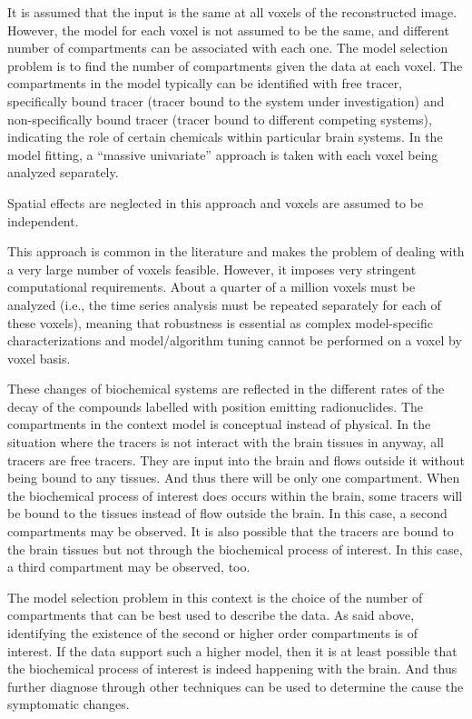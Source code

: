 It is assumed that the input is the same at all voxels of the reconstructed image. However, the model for each voxel is not assumed to be the same, and different number of compartments can be associated with each one. The model selection problem is to find the number of compartments given the data at each voxel. The compartments in the model typically can be identified with free tracer, specifically bound tracer (tracer bound to the system under investigation) and non-specifically bound tracer (tracer bound to different competing systems), indicating the role of certain chemicals within particular brain systems. In the model fitting, a ``massive univariate'' approach is taken with each voxel being analyzed separately.
\begin{draftpar}
Spatial effects are neglected in this approach and voxels are assumed to be independent.
\end{draftpar}
This approach is common in the literature and makes the problem of dealing with a very large number of voxels feasible. However, it imposes very stringent computational requirements. About a quarter of a million voxels must be analyzed (i.e., the time series analysis must be repeated separately for each of these voxels), meaning that robustness is essential as complex model-specific characterizations and model/algorithm tuning cannot be performed on a voxel by voxel basis.

\begin{draftpar}
These changes of biochemical systems are reflected in the different rates of the decay of the compounds labelled with position emitting radionuclides. The compartments in the context \pet model is conceptual instead of physical. In the situation where the tracers is not interact with the brain tissues in anyway, all tracers are free tracers. They are input into the brain and flows outside it without being bound to any tissues. And thus there will be only one compartment. When the biochemical process of interest does occurs within the brain, some tracers will be bound to the tissues instead of flow outside the brain. In this case, a second compartments may be observed. It is also possible that the tracers are bound to the brain tissues but not through the biochemical process of interest. In this case, a third compartment may be observed, too.

The model selection problem in this context is the choice of the number of compartments that can be best used to describe the data. As said above, identifying the existence of the second or higher order compartments is of interest. If the data support such a higher model, then it is at least possible that the biochemical process of interest is indeed happening with the brain. And thus further diagnose through other techniques can be used to determine the cause the symptomatic changes.
\end{draftpar}

